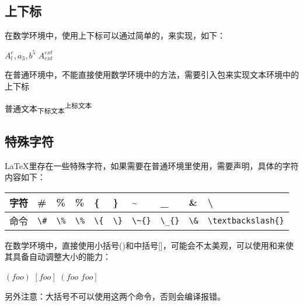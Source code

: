     \subsection{上下标}
    在数学环境中，使用上下标可以通过简单的\highunderline{\_{}}，\highunderline{\^{}}来实现，如下：
    \begin{texshow}
        $A^e_l,a_3,b^5$
        $A^{ext}_{ext}$ %
    \end{texshow}

    在普通环境中，不能直接使用数学环境中的方法，需要引入包来实现文本环境中的上下标
    \begin{texshow}
        普通文本\textsubscript{下标文本}\textsuperscript{上标文本}
    \end{texshow}


    \subsection{特殊字符}
    \LaTeX 里存在一些特殊字符，如果需要在普通环境里使用，需要声明，具体的字符内容如下：
    \begin{center}
        \setlength\tablewidth{\dimexpr (\textwidth -20\tabcolsep)}
        \begin{table}[H]
            \begin{tabular}{|p{0.06\tablewidth}<{\centering}|p{0.06\tablewidth}<{\centering}|p{0.06\tablewidth}<{\centering}|p{0.06\tablewidth}<{\centering}|p{0.06\tablewidth}<{\centering}|p{0.06\tablewidth}<{\centering}|p{0.08\tablewidth}<{\centering}|p{0.08\tablewidth}<{\centering}|p{0.06\tablewidth}<{\centering}|p{0.41\tablewidth}<{\centering}|}
                \hline
                字符&\#&\%&\%&\{&\}&\~{}&\_{}&\&&\textbackslash\\
                \hline
                命令&\verb|\#|&\verb|\%|&\verb|\%|&\verb|\{|&\verb|\}|&\verb|\~{}|&\verb|\_{}|&\verb|\&|&\verb|\textbackslash{}|\\
                \hline
            \end{tabular}
        \end{table}
    \end{center}
    
    在数学环境中，直接使用小括号()和中括号[]，可能会不太美观，可以使用和来使其具备自动调整大小的能力：
    \begin{texshow}
        $\left( foo \right)$
        $\left[ foo \right]$
        $\left( foo \right.$ %
        $\left. foo \right]$ %
    \end{texshow}
    另外注意：大括号不可以使用这两个命令，否则会编译报错。

